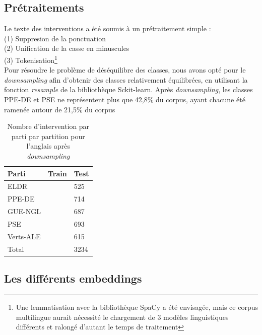 \subsection{Prétraitements}
Le texte des interventions a été soumis à un prétraitement simple :\\
\indent(1) Suppresion de la ponctuation\\
\indent(2) Unification de la casse en minuscules\\
\indent(3) Tokenisation\footnote {Une lemmatisation avec la bibliothèque SpaCy a été envisagée,
mais ce corpus multilingue aurait nécessité le chargement de 3 modèles linguistiques
différents et ralongé d'autant le temps de traitement}
\\
Pour résoudre le problème de déséquilibre des classes, nous avons opté pour le 
\textit{downsampling} afin d'obtenir des classes relativement équilibrées,
en utilisant la fonction \textit{resample} de la bibliothèque Sckit-learn. Après \textit{downsampling},
les classes PPE-DE et PSE ne représentent plus que 42,8\% du corpus, ayant chacune été ramenée autour de 21,5\% du corpus

\begin{table}[ht]
    \centering
\begin{tabular}{|l|l|l|}
\hline
Parti & Train & Test\\ \hline
ELDR &  & 525 \\ \hline
PPE-DE &  & 714 \\ \hline
GUE-NGL &  & 687 \\ \hline
PSE &  & 693 \\ \hline
Verts-ALE &  & 615\\ \hline
Total &  & 3234\\ \hline

\end{tabular}
\caption{Nombre d'intervention par parti par partition pour l'anglais après \textit{downsampling}}
\label{tab:stats_downsampled}
\end{table}


\subsection{Les différents embeddings}